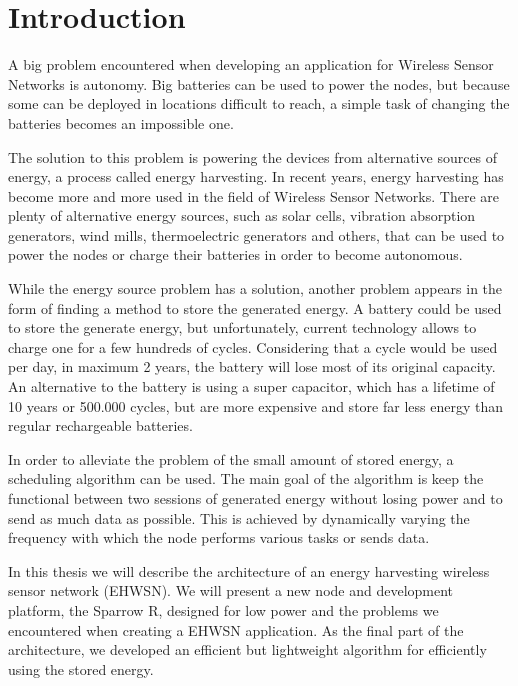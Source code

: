 \normalfont\normalsize
\chapter{Introduction}


A big problem encountered when developing an application for  Wireless Sensor Networks is autonomy.
Big batteries can be used to power the nodes, but because some can be deployed in locations
difficult to reach, a simple task of changing the batteries becomes an impossible one.

The solution to this problem is powering the devices from alternative sources of energy, a process
called energy harvesting. In recent years, energy harvesting has become more and more used in the field of Wireless
Sensor Networks. There are plenty of alternative energy sources, such as solar cells, vibration
absorption generators, wind mills, thermoelectric generators and others, that can be used to power the
nodes or charge their batteries in order to become autonomous.

While the energy source problem has a solution, another problem appears in the form of finding a
method to store the generated energy. A battery could be used to store the generate energy, but
unfortunately, current technology allows to charge one for a few hundreds of cycles.
Considering that a cycle would be used per day, in maximum 2 years, the battery will lose most of
its original capacity. An alternative to the battery is using a super capacitor, which has a
lifetime of 10 years or 500.000 cycles, but are more expensive and store far less energy than regular
rechargeable batteries.

In order to alleviate the problem of the small amount of stored energy, a scheduling algorithm can
be used. The main goal of the algorithm is keep the functional between two sessions of generated
energy without losing power and to send as much data as possible. This is achieved by dynamically
varying the frequency with which the node performs various tasks or sends data.

In this thesis we will describe the architecture of an energy harvesting wireless sensor network
(EHWSN). We will present a new node and development platform, the Sparrow R, designed
for low power and the problems we encountered when creating a EHWSN application. As the final part
of the architecture, we developed an efficient but lightweight algorithm for efficiently using the stored energy.


